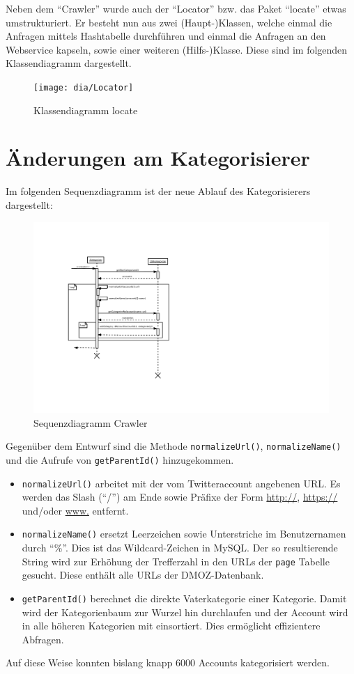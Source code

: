 Neben dem "`Crawler"' wurde auch der "`Locator"' bzw. das Paket "`locate"' etwas umstrukturiert. Er besteht nun aus zwei (Haupt-)Klassen, welche einmal die Anfragen mittels Hashtabelle durchführen und einmal die Anfragen an den Webservice kapseln, sowie einer weiteren (Hilfs-)Klasse. Diese sind im folgenden Klassendiagramm dargestellt.
 \begin{figure}[H]
 	\centering
 	\texttt{[image: dia/Locator]}
 	\caption{Klassendiagramm locate}
 	\label{fig:locate}
 \end{figure}

\section{Änderungen am Kategorisierer}
Im folgenden Sequenzdiagramm ist der neue Ablauf des Kategorisierers dargestellt:
\begin{figure}[H]
	\centering
	\includegraphics[width=\textwidth,height=\textheight,keepaspectratio=true]{dia/categorizerSequence}
	\caption{Sequenzdiagramm Crawler}
	\label{fig:Crawler}
\end{figure}
Gegenüber dem Entwurf sind die Methode \lstinline{normalizeUrl()}, \lstinline{normalizeName()} und die Aufrufe von \lstinline{getParentId()} hinzugekommen.
\begin{itemize}
	\item \lstinline{normalizeUrl()} arbeitet mit der vom Twitteraccount angebenen URL. Es werden das Slash ("`/"') am Ende sowie Präfixe der Form \url{http://}, \url{https://} und/oder \url{www.} entfernt.
	\item \lstinline{normalizeName()} ersetzt Leerzeichen sowie Unterstriche im Benutzernamen durch "`\%"'. Dies ist das Wildcard-Zeichen in MySQL. Der so resultierende String wird zur Erhöhung der Trefferzahl in den URLs der \lstinline{page} Tabelle gesucht. Diese enthält alle URLs der DMOZ-Datenbank.
	\item \lstinline{getParentId()} berechnet die direkte Vaterkategorie einer Kategorie. Damit wird der Kategorienbaum zur Wurzel hin durchlaufen und der Account wird in alle höheren Kategorien mit einsortiert. Dies ermöglicht effizientere Abfragen.
\end{itemize}
Auf diese Weise konnten bislang knapp 6000 Accounts kategorisiert werden.

